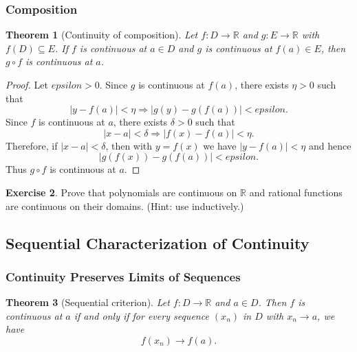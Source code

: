 \documentclass[12pt]{article}
\numberwithin{equation}{section}
\def\abs#1{|#1|}
\def\eps{epsilon}
\newcommand{\RR}{\mathbb{R}}
\DeclarePairedDelimiter{\abs}{\lvert}{\rvert}
\newcommand{\eps}{\varepsilon}               %
\theoremstyle{plain}
\newtheorem{theorem}{Theorem}[section]
\theoremstyle{definition}
\newtheorem{exercise}[theorem]{Exercise}
\theoremstyle{remark}
\begin{document}
\subsubsection{Composition}

\begin{theorem}[Continuity of composition]\label{thm:cont-composition}
Let $f:D\to\RR$ and $g:E\to\RR$ with $f(D)\subseteq E$.
If $f$ is continuous at $a\in D$ and $g$ is continuous at $f(a)\in E$, then $g\circ f$ is continuous at $a$.
\end{theorem}

\begin{proof}
Let $\eps>0$. Since $g$ is continuous at $f(a)$, there exists $\eta>0$ such that
\[
\abs{y-f(a)}<\eta \Rightarrow \abs{g(y)-g(f(a))}<\eps.
\]
Since $f$ is continuous at $a$, there exists $\delta>0$ such that
\[
\abs{x-a}<\delta \Rightarrow \abs{f(x)-f(a)}<\eta.
\]
Therefore, if $\abs{x-a}<\delta$, then with $y=f(x)$ we have $\abs{y-f(a)}<\eta$ and hence
\[
\abs{g(f(x))-g(f(a))}<\eps.
\]
Thus $g\circ f$ is continuous at $a$.
\end{proof}

\begin{exercise}
Prove that polynomials are continuous on $\RR$ and rational functions are continuous on their domains.
(Hint: use  inductively.)
\end{exercise}

\newpage

\subsection{Sequential Characterization of Continuity}

\subsubsection{Continuity Preserves Limits of Sequences}

\begin{theorem}[Sequential criterion]\label{thm:cont-seq}
Let $f:D\to\RR$ and $a\in D$.
Then $f$ is continuous at $a$ if and only if for every sequence $(x_n)$ in $D$ with $x_n\to a$, we have
\[
f(x_n)\to f(a).
\]
\end{theorem}
\end{document}
